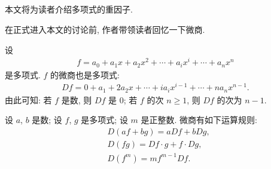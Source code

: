 \subsection*{\MultipleFactors}
\markright{\MultipleFactors}

本文将为读者介绍多项式的重因子.

在正式进入本文的讨论前, 作者带领读者回忆一下微商.

设
\begin{align*}
    f = a_0 + a_1 x + a_2 x^2 + \cdots + a_i x^i + \cdots + a_n x^n
\end{align*}
是多项式. $f$ 的微商也是多项式:
\begin{align*}
    Df = 0 + a_1 + 2a_2 x + \cdots + i a_i x^{i-1} + \cdots + n a_n x^{n-1}.
\end{align*}
由此可知: 若 $f$ 是数, 则 $Df$ 是 $0$; 若 $f$ 的次 $n \geq 1$, 则 $Df$ 的次为 $n - 1$.

设 $a$, $b$ 是数; 设 $f$, $g$ 是多项式; 设 $m$ 是正整数. 微商有如下运算规则:
\begin{align*}
     & D(af + bg) = aDf + bDg,          \\
     & D(fg) = Df \cdot g + f \cdot Dg, \\
     & D(f^m) = mf^{m-1} Df.
\end{align*}

